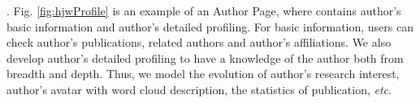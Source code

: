 . Fig. \ref{fig:hjwProfile} is an example of an Author Page, where contains author's basic information and author's detailed profiling. For basic information, users can check author's publications, related authors and author's affiliations. We also develop author's detailed profiling to have a knowledge of the author both from breadth and depth. Thus, we model the evolution of author's research interest, author's avatar with word cloud description, the statistics of publication, {\em etc}.



